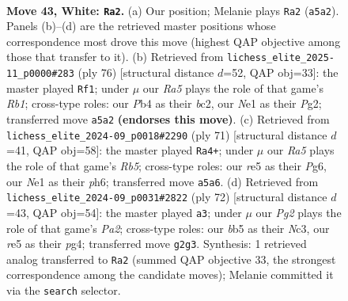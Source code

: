 \documentclass[11pt]{article}
\begin{document}
\clearpage

\begin{figure}[p]\centering
\begin{subfigure}{0.46\textwidth}\centering
\resizebox{\linewidth}{!}{%
\newchessgame
\chessboard[
  setfen={2r5/5B2/2k2N2/Rb2rp2/1P5R/8/6P1/3KN3 w - - 1 43},
  showmover=false,
  pgfstyle=straightmove, color=movearrow, markmove={a5-a2}
]}
\caption{}
\end{subfigure}\hfill
\begin{subfigure}{0.46\textwidth}\centering
\resizebox{\linewidth}{!}{%
\newchessgame
\chessboard[
  setfen={1r3k2/6p1/7p/8/P1B5/5N2/1bb3PP/1R5K w - - 4 39},
  showmover=false,
  pgfstyle=straightmove, color=movearrow, markmove={b1-f1}
]}
\caption{}
\end{subfigure}
\\[4pt]
\begin{subfigure}{0.46\textwidth}\centering
\resizebox{\linewidth}{!}{%
\newchessgame
\chessboard[
  setfen={8/4k3/6pP/P1p2n2/1rB2R2/4r3/K7/7R b - - 0 36},
  showmover=false,
  pgfstyle=straightmove, color=movearrow, markmove={b4-a4}
]}
\caption{}
\end{subfigure}\hfill
\begin{subfigure}{0.46\textwidth}\centering
\resizebox{\linewidth}{!}{%
\newchessgame
\chessboard[
  setfen={4k3/2R5/1pb5/8/2r3p1/2N3K1/PP6/8 w - - 4 37},
  showmover=false,
  pgfstyle=straightmove, color=movearrow, markmove={a2-a3}
]}
\caption{}
\end{subfigure}
\caption{\textbf{Move 43, White: \texttt{Ra2}.} (a) Our position; Melanie plays \texttt{Ra2} (\texttt{a5a2}). Panels (b)--(d) are the retrieved master positions whose correspondence most drove this move (highest QAP objective among those that transfer to it). (b) Retrieved from \texttt{lichess\_elite\_2025-11\_p0000\#283} (ply 76) [structural distance $d$=52, QAP obj=33]: the master played \texttt{Rf1}; under $\mu$ our \emph{Ra5} plays the role of that game's \emph{Rb1}; cross-type roles: our \emph{P}b4 as their \emph{b}c2, our \emph{N}e1 as their \emph{P}g2; transferred move \texttt{a5a2} \textbf{(endorses this move)}. (c) Retrieved from \texttt{lichess\_elite\_2024-09\_p0018\#2290} (ply 71) [structural distance $d$=41, QAP obj=58]: the master played \texttt{Ra4+}; under $\mu$ our \emph{Ra5} plays the role of that game's \emph{Rb5}; cross-type roles: our \emph{r}e5 as their \emph{P}g6, our \emph{N}e1 as their \emph{p}h6; transferred move \texttt{a5a6}. (d) Retrieved from \texttt{lichess\_elite\_2024-09\_p0031\#2822} (ply 72) [structural distance $d$=43, QAP obj=54]: the master played \texttt{a3}; under $\mu$ our \emph{Pg2} plays the role of that game's \emph{Pa2}; cross-type roles: our \emph{b}b5 as their \emph{N}c3, our \emph{r}e5 as their \emph{p}g4; transferred move \texttt{g2g3}. Synthesis: 1 retrieved analog transferred to \texttt{Ra2} (summed QAP objective 33, the strongest correspondence among the candidate moves); Melanie committed it via the \texttt{search} selector.}
\label{fig:thought-m84}
\end{figure}
\end{document}
